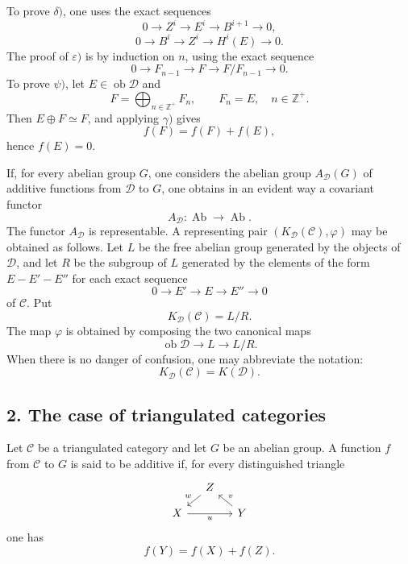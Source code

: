 \documentclass[11pt]{article}
\providecommand{\Ob}{\operatorname{ob}}
\providecommand{\cC}{\mathcal C}
\providecommand{\Ob}{\operatorname{ob}}
\providecommand{\Ab}{\operatorname{Ab}}
\providecommand{\cC}{\mathcal C}
\providecommand{\cD}{\mathcal D}
\providecommand{\Ab}{\operatorname{Ab}}
\providecommand{\Ob}{\operatorname{Ob}}
\providecommand{\Ob}{\operatorname{ob}}
\providecommand{\Ob}{\operatorname{Ob}}
\begin{document}
To prove $\delta)$, one uses the exact sequences
\[
0\longrightarrow Z^i\longrightarrow E^i\longrightarrow B^{i+1}\longrightarrow 0,
\]
\[
0\longrightarrow B^i\longrightarrow Z^i\longrightarrow H^i(E)\longrightarrow 0.
\]
The proof of $\varepsilon)$ is by induction on $n$, using the exact sequence
\[
0\longrightarrow F_{n-1}\longrightarrow F\longrightarrow F/F_{n-1}\longrightarrow 0.
\]
To prove $\psi)$, let $E\in\Ob\cD$ and
\[
F=\bigoplus_{n\in\mathbb Z^+}F_n,\qquad F_n=E,\quad n\in\mathbb Z^+.
\]
Then $E\oplus F\simeq F$, and applying $\gamma)$ gives
\[
f(F)=f(F)+f(E),
\]
hence $f(E)=0$.

If, for every abelian group $G$, one considers the abelian group $A_{\cD}(G)$ of additive functions from $\cD$ to $G$, one obtains in an evident way a covariant functor
\[
A_{\cD}:\Ab\longrightarrow\Ab.
\]
The functor $A_{\cD}$ is representable. A representing pair $(K_{\cD}(\cC),\varphi)$ may be obtained as follows. Let $L$ be the free abelian group generated by the objects of $\cD$, and let $R$ be the subgroup of $L$ generated by the elements of the form $E-E'-E''$ for each exact sequence
\[
0\longrightarrow E'\longrightarrow E\longrightarrow E''\longrightarrow 0
\]
of $\cC$. Put
\[
K_{\cD}(\cC)=L/R.
\]
The map $\varphi$ is obtained by composing the two canonical maps
\[
\Ob\cD\longrightarrow L\longrightarrow L/R.
\]
When there is no danger of confusion, one may abbreviate the notation:
\[
K_{\cD}(\cC)=K(\cD).
\]

\subsection*{2. The case of triangulated categories}

Let $\cC$ be a triangulated category and let $G$ be an abelian group. A function $f$ from $\cC$ to $G$ is said to be additive if, for every distinguished triangle
\[
\begin{tikzcd}[column sep=small,row sep=small]
& Z \arrow[dl,"w"']\\
X \arrow[rr,"u"'] && Y \arrow[ul,"v"']
\end{tikzcd}
\]
one has
\[
f(Y)=f(X)+f(Z).
\]
\end{document}
